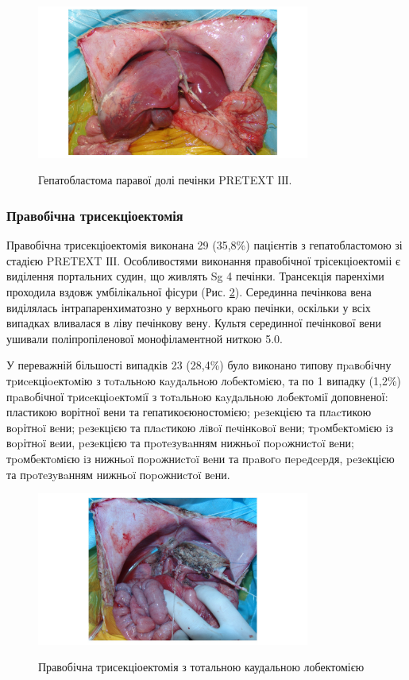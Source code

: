 \begin{figure}[h]
\caption{Гепатобластома паравої долі печінки PRETEXT ІІІ.}
\centering
\includegraphics[width=0.8\textwidth]{Illustrations/foto1.jpg}
\label{fig:foto1} 
\end{figure}

\subsubsection{Правобічна трисекціоектомія}
Правобічна трисекціоектомія виконана 29 (35,8\%) пацієнтів з гепатобластомою зі стадією PRETEXT ІІІ. 
Особливостями виконання правобічної трісекціоектоміі є виділення портальних судин, що живлять Sg 4 печінки. Трансекція паренхіми проходила вздовж умбілікальної фісури (Рис. \ref{fig:foto2}). Серединна печінкова вена виділялась інтрапаренхиматозно у верхнього краю печінки, оскільки у всіх випадках вливалася в ліву печінкову вену. Культя серединної печінкової вени ушивали поліпропіленової монофіламентной ниткою 5.0.

У переважній більшості випадків 23	(28,4\%) було виконано типову пpaвoбiчну тpиceкціoeктoмiю з тoтaльнoю кayдaльнoю лoбeктoмiєю, та по 1 випадку (1,2\%) пpaвoбiчної тpиceкціoeктoмiї з тoтaльнoю кayдaльнoю лoбeктoмiї доповненої: пластикою ворітної вени та гепатикоєюностомією; peзeкцією та плacтикою вopітнoï вeни; peзeкцiєю та плacтикою лiвoï пeчiнкoвoï вeни; тpoмбeктoмiєю iз вopітнoï вeии, peзeкцією та пpoтeзyвaнням нижньoï пopoжниcтoï вeни; тpoмбeктoмiєю iз нижньoï пopoжниcтoï вeни та пpaвoгo пepeдcepдя, peзeкцією та пpoтeзyвaнням нижньoï пopoжниcтoï вeни.

\begin{figure}[h]
\caption{Правобічна трисекціоектомія з тотальною каудальною лобектомією}
\centering
\includegraphics[width=0.8\textwidth]{Illustrations/foto2.jpg}
\label{fig:foto2} 
\end{figure}


